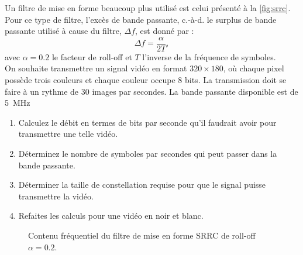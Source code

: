 \documentclass [a4paper, 11pt] {article}
\begin{document}
    \begin{exercice}{4}
        
        Un filtre de mise en forme beaucoup plus utilisé est celui présenté à la \autoref{fig:srrc}. Pour ce type de filtre, l'excès de bande passante, c.-à-d. le surplus de bande passante utilisé à cause du filtre, $\Delta f$, est donné par :
        \begin{equation}
            \Delta f = \frac{\alpha}{2 T},
        \end{equation}
        avec $\alpha=0.2$ le facteur de roll-off et $T$ l'inverse de la fréquence de symboles.\\
        
        On souhaite transmettre un signal vidéo en format $320\times180$, où chaque pixel possède trois couleurs et chaque couleur occupe 8 bits. La transmission doit se faire à un rythme de 30 images par secondes. La bande passante disponible est de \SI{5}{\mega\hertz}
        
        \begin{enumerate}
            \item Calculez le débit en termes de bits par seconde qu'il faudrait avoir pour transmettre une telle vidéo.
            \item Déterminez le nombre de symboles par secondes qui peut passer dans la bande passante.
            \item Déterminer la taille de constellation requise pour que le signal puisse transmettre la vidéo.
            \item Refaites les calculs pour une vidéo en noir et blanc.
        \end{enumerate}
        
        \begin{figure}[H]
            \centering
            \caption{Contenu fréquentiel du filtre de mise en forme SRRC de roll-off $\alpha=0.2$.}
            \label{fig:srrc}
        \end{figure}
        
    \end{exercice}
        
\end{document}
